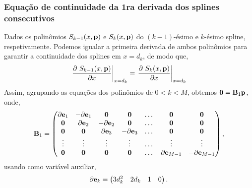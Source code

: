 \subsubsection{Equação de continuidade da 1ra derivada dos splines consecutivos}
\label{subsubsec:part1}
Dados os polinômios $S_{k-1}(x,\VECTOR{p})$ e $S_{k}(x,\VECTOR{p})$ do $(k-1)$-ésimo e $k$-ésimo spline,
respetivamente. Podemos igualar a primeira derivada de  ambos polinômios para garantir a continuidade dos splines em $x=d_{k}$, 
de modo que,
\begin{equation}
 \left.\frac{\partial~S_{k-1}(x,\VECTOR{p})}{\partial x}\right|_{x=d_{k}} = 
 \left.\frac{\partial~S_{k}  (x,\VECTOR{p})}{\partial x}\right|_{x=d_{k}}
\end{equation}
Assim, agrupando as equações dos polinômios de  $0<k<M$, obtemos $\mathbf{0}=\MATRIX{B}_1 \VECTOR{p}$, onde,
\begin{equation}
\MATRIX{B}_1 =\left(\begin{matrix}
\partial\VECTOR{e}_1 & -\partial\VECTOR{e}_1   & \mathbf{0}    &  \mathbf{0}   & \dots & \mathbf{0} & \mathbf{0}\\
\mathbf{0}   &  \partial\VECTOR{e}_2   & -\partial\VECTOR{e}_2 &  \mathbf{0}   & \dots & \mathbf{0} & \mathbf{0}\\
\mathbf{0}   &  \mathbf{0}     &  \partial\VECTOR{e}_3 & -\partial\VECTOR{e}_3 & \dots & \mathbf{0} & \mathbf{0}\\
\vdots       &  \vdots         &  \vdots       &  \vdots       & \dots & \vdots     & \vdots\\
\mathbf{0}   &  \mathbf{0}     &  \mathbf{0}   &  \mathbf{0}   & \dots & \partial\VECTOR{e}_{M-1} & -\partial\VECTOR{e}_{M-1} \\
\end{matrix}\right),
\end{equation}
usando como variável auxiliar,
\begin{equation}
\partial\VECTOR{e}_k =\left(\begin{matrix}
3d^2_k & 2d_k   & 1 & 0  \\
\end{matrix}\right).
\end{equation}

